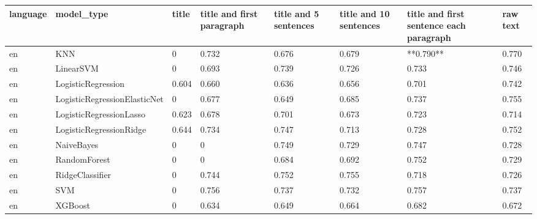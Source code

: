 \begin{tabular}{llllllll}
\toprule
language &                   model\_type & title & title and first paragraph & title and 5 sentences & title and 10 sentences & title and first sentence each paragraph &  raw text \\
\midrule
      en &                          KNN &     0 &                     0.732 &                 0.676 &                  0.679 &                               **0.790** &     0.770 \\
      en &                    LinearSVM &     0 &                     0.693 &                 0.739 &                  0.726 &                                   0.733 &     0.746 \\
      en &           LogisticRegression & 0.604 &                     0.660 &                 0.636 &                  0.656 &                                   0.701 &     0.742 \\
      en & LogisticRegressionElasticNet &     0 &                     0.677 &                 0.649 &                  0.685 &                                   0.737 &     0.755 \\
      en &      LogisticRegressionLasso & 0.623 &                     0.678 &                 0.701 &                  0.673 &                                   0.723 &     0.714 \\
      en &      LogisticRegressionRidge & 0.644 &                     0.734 &                 0.747 &                  0.713 &                                   0.728 &     0.752 \\
      en &                   NaiveBayes &     0 &                         0 &                 0.749 &                  0.729 &                                   0.747 &     0.728 \\
      en &                 RandomForest &     0 &                         0 &                 0.684 &                  0.692 &                                   0.752 &     0.729 \\
      en &              RidgeClassifier &     0 &                     0.744 &                 0.752 &                  0.755 &                                   0.718 &     0.726 \\
      en &                          SVM &     0 &                     0.756 &                 0.737 &                  0.732 &                                   0.757 &     0.737 \\
      en &                      XGBoost &     0 &                     0.634 &                 0.649 &                  0.664 &                                   0.682 &     0.672 \\

\end{tabular}
